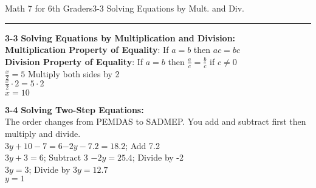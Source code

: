 \begin{enumerate*}
\newpage
\noindent\Large{Math 7 for 6th Graders\hfill 3-3 Solving Equations by Mult. and Div.}
\noindent\hrule
\vspace{5mm}
				
		\item[\Large\textbf{3-3}] \Large\textbf{Solving Equations by Multiplication and Division:}\\
			\textbf{Multiplication Property of Equality}: If $a=b$ then $ac=bc$\\
			\textbf{Division Property of Equality}: If $a=b$ then $\frac{a}{c}=\frac{b}{c}$ if $c\neq0$\\
			$\frac{x}{2}=5$ Multiply both sides by 2\\$\frac{x}{2}\cdot2=5\cdot2$\\$x=10$\\
			
		\item[\Large\textbf{3-4}] \Large\textbf{Solving Two-Step Equations:}\\
			The order changes from PEMDAS to SADMEP. You add and subtract first then multiply and divide.\\
			$3y+10-7=6$\hfill$-2y-7.2=18.2$; Add 7.2 \\
			$3y+3=6$; Subtract 3 \hfill$-2y=25.4$; Divide by -2\\
			$3y=3$; Divide by 3\hfill$y=12.7$\\$y=1$\\
			

\end{enumerate*}
